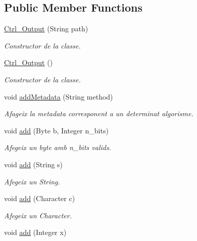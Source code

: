 \subsection*{Public Member Functions}
\begin{DoxyCompactItemize}
\item 
\hyperlink{classpersistencia_1_1output_1_1Ctrl__Output_ab8a70c7d09789826249d8556ce3531f6}{Ctrl\+\_\+\+Output} (String path)
\begin{DoxyCompactList}\small\item\em Constructor de la classe. \end{DoxyCompactList}\item 
\hyperlink{classpersistencia_1_1output_1_1Ctrl__Output_a8f5bf9038ef97c01d13acd211985cd7a}{Ctrl\+\_\+\+Output} ()
\begin{DoxyCompactList}\small\item\em Constructor de la classe. \end{DoxyCompactList}\item 
void \hyperlink{classpersistencia_1_1output_1_1Ctrl__Output_ae6d6857910a023982900ddc857b891f0}{add\+Metadata} (String method)
\begin{DoxyCompactList}\small\item\em Afageix la metadata corresponent a un determinat algorisme. \end{DoxyCompactList}\item 
void \hyperlink{classpersistencia_1_1output_1_1Ctrl__Output_a8c5aa5a6acb5259faeb1c05c71ddd21c}{add} (Byte b, Integer n\+\_\+bits)
\begin{DoxyCompactList}\small\item\em Afegeix un byte amb n\+\_\+bits valids. \end{DoxyCompactList}\item 
void \hyperlink{classpersistencia_1_1output_1_1Ctrl__Output_a0e3bedb0b88d0e60b228cc49143e6f0e}{add} (String s)
\begin{DoxyCompactList}\small\item\em Afegeix un String. \end{DoxyCompactList}\item 
void \hyperlink{classpersistencia_1_1output_1_1Ctrl__Output_a4070b40016edf1d959b3f7c60c90ef10}{add} (Character c)
\begin{DoxyCompactList}\small\item\em Afegeix un Character. \end{DoxyCompactList}\item 
void \hyperlink{classpersistencia_1_1output_1_1Ctrl__Output_aefe249b0ae9dbe578c44d96c6b56cf5d}{add} (Integer x)

\end{DoxyCompactItemize}
